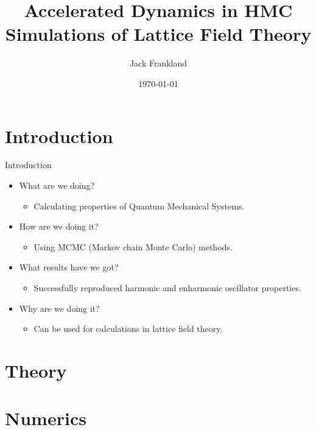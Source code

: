 \documentclass{beamer}
\title[Your Short Title]{Accelerated Dynamics in HMC Simulations of Lattice Field
Theory}
\author{Jack Frankland}
\institute{University of Edinburgh}
\date{\today{}}
\begin{document}
\begin{frame}
  \titlepage
\end{frame}


\section{Introduction}

\begin{frame}{Introduction}

\begin{itemize}
  \item<1-> What are we  doing? 
    \begin{itemize}
        \item Calculating properties of Quantum Mechanical Systems.
    \end{itemize}
  \item<2-> How are we doing it?
    \begin{itemize}
        \item Using MCMC (Markov chain Monte Carlo) methods.
    \end{itemize}
  \item<3-> What results have we got?
  \begin{itemize}
        \item Successfully reproduced harmonic and enharmonic oscillator properties.
    \end{itemize}
  \item<4-> Why are we doing it?
  \begin{itemize}
    \item Can be used for calculations in lattice field theory.
  \end{itemize}
\end{itemize}



\end{frame}

\section{Theory}

\section{Numerics}
\end{document}
